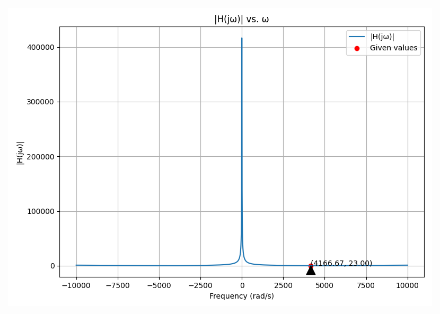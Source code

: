 \documentclass[journal,12pt,twocolumn]{IEEEtran}
\theoremstyle{remark}
\begin{document}
\begin{figure}[h!]
  \centering
  \includegraphics[width=\columnwidth]{ncert-physics/12/7/20/figs/analog.png}
  \label{fig:ashleyannbode_Plot}
\end{figure}

\end{document}
